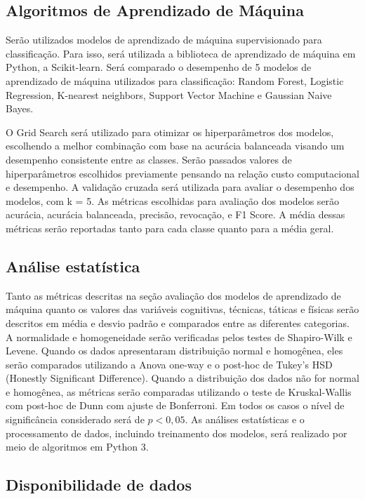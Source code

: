 \documentclass[a4paper]{article}
\theoremstyle{plain}
\theoremstyle{definition}
\begin{document}
\subsection{Algoritmos de Aprendizado de Máquina}
Serão utilizados modelos de aprendizado de máquina supervisionado para classificação. Para isso, será utilizada a biblioteca de aprendizado de máquina em Python, a Scikit-learn\cite{pedregosa2011scikit}. Será comparado o desempenho de 5 modelos de aprendizado de máquina utilizados para classificação: Random Forest, Logistic Regression, K-nearest neighbors, Support Vector Machine e Gaussian Naive Bayes.

O Grid Search será utilizado para otimizar os hiperparâmetros dos modelos, escolhendo a melhor combinação com base na acurácia balanceada visando um desempenho consistente entre as classes. Serão passados valores de hiperparâmetros escolhidos previamente pensando na relação custo computacional e desempenho. A validação cruzada será utilizada para avaliar o desempenho dos modelos, com k = 5. As métricas escolhidas para avaliação dos modelos serão acurácia, acurácia balanceada, precisão, revocação, e F1 Score. A média dessas métricas serão reportadas tanto para cada classe quanto para a média geral\cite{raschka2017python}. 

\subsection{Análise estatística}
Tanto as métricas descritas na seção avaliação dos modelos de aprendizado de máquina quanto os valores das variáveis cognitivas, técnicas, táticas e físicas serão descritos em média e desvio padrão e comparados entre as diferentes categorias. A normalidade e homogeneidade serão verificadas pelos testes de Shapiro-Wilk e Levene. Quando os dados apresentaram distribuição normal e homogênea, eles serão comparados utilizando a Anova one-way e o post-hoc de Tukey's HSD (Honestly Significant Difference). Quando a distribuição dos dados não for normal e homogênea, as métricas serão comparadas utilizando o teste de Kruskal-Wallis com post-hoc de Dunn com ajuste de Bonferroni. Em todos os casos o nível de significância considerado será de $p < 0{,}05$. As análises estatísticas e o processamento de dados, incluindo treinamento dos modelos, será realizado por meio de algoritmos em Python 3. 

\subsection{Disponibilidade de dados}
\end{document}
